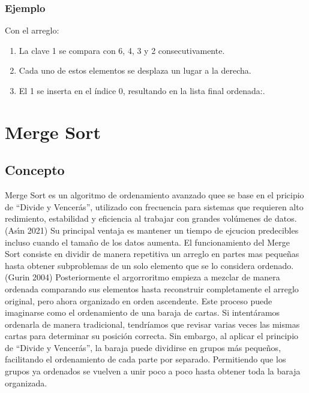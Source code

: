 \documentclass[
  spanish,
  letterpaper,
  DIV=11,
  numbers=noendperiod]{scrreprt}
\providecommand{\tightlist}{%
  \setlength{\itemsep}{0pt}\setlength{\parskip}{0pt}}
\begin{document}
\subsubsection{\texorpdfstring{\textbf{Ejemplo}}{Ejemplo}}\label{ejemplo-3}

Con el arreglo:

\begin{enumerate}
\def\labelenumi{\arabic{enumi}.}
\tightlist
\item
  La clave 1 se compara con 6, 4, 3 y 2 consecutivamente.
\item
  Cada uno de estos elementos se desplaza un lugar a la derecha.
\item
  El 1 se inserta en el índice 0, resultando en la lista final
  ordenada:.
\end{enumerate}

\section{Merge Sort}\label{merge-sort}

\subsection{Concepto}\label{concepto-2}

Merge Sort es un algoritmo de ordenamiento avanzado quee se base en el
pricipio de ``Divide y Vencerás'', utilizado con frecuencia para
sistemas que requieren alto redimiento, estabilidad y eficiencia al
trabajar con grandes volúmenes de datos.(Ası́n 2021) Su principal ventaja
es mantener un tiempo de ejcucion predecibles incluso cuando el tamaño
de los datos aumenta. El funcionamiento del Merge Sort consiste en
dividir de manera repetitiva un arreglo en partes mas pequeñas hasta
obtener subproblemas de un solo elemento que se lo considera
ordenado.(Gurin 2004) Posteriormente el argorroritmo empieza a mezclar
de manera ordenada comparando sus elementos hasta reconstruir
completamente el arreglo original, pero ahora organizado en orden
ascendente. Este proceso puede imaginarse como el ordenamiento de una
baraja de cartas. Si intentáramos ordenarla de manera tradicional,
tendríamos que revisar varias veces las mismas cartas para determinar su
posición correcta. Sin embargo, al aplicar el principio de ``Divide y
Vencerás'', la baraja puede dividirse en grupos más pequeños,
facilitando el ordenamiento de cada parte por separado. Permitiendo que
los grupos ya ordenados se vuelven a unir poco a poco hasta obtener toda
la baraja organizada.
\end{document}
